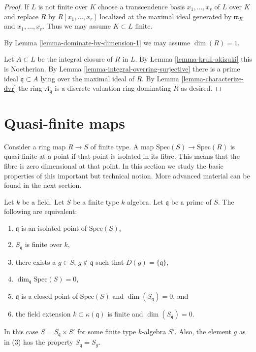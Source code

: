 \begin{proof}
If $L$ is not finite over $K$ choose a transcendence basis
$x_1, \ldots, x_r$ of $L$ over $K$ and replace $R$ by
$R[x_1, \ldots, x_r]$ localized at the maximal ideal
generated by $\mathfrak m_R$ and $x_1, \ldots, x_r$.
Thus we may assume $K \subset L$ finite.

\medskip\noindent
By Lemma \ref{lemma-dominate-by-dimension-1} we may assume $\dim(R) = 1$.

\medskip\noindent
Let $A \subset L$ be the integral closure of $R$ in $L$.
By Lemma \ref{lemma-krull-akizuki} this is Noetherian.
By Lemma \ref{lemma-integral-overring-surjective} there
is a prime ideal $\mathfrak q \subset A$ lying
over the maximal ideal of $R$.
By Lemma \ref{lemma-characterize-dvr} the ring $A_{\mathfrak q}$ is a discrete
valuation ring dominating $R$ as desired.
\end{proof}
















\section{Quasi-finite maps}
\label{section-quasi-finite}

\noindent
Consider a ring map $R \to S$ of finite type.
A map $\text{Spec}(S) \to \text{Spec}(R)$ is quasi-finite
at a point if that point is isolated in its fibre.
This means that the fibre is zero dimensional at that point.
In this section we study the basic properties of this
important but technical notion. More advanced material
can be found in the next section.

\begin{lemma}
\label{lemma-isolated-point}
Let $k$ be a field.
Let $S$ be a finite type $k$ algebra.
Let $\mathfrak q$ be a prime of $S$.
The following are equivalent:
\begin{enumerate}
\item $\mathfrak q$ is an isolated point of $\text{Spec}(S)$,
\item $S_{\mathfrak q}$ is finite over $k$,
\item there exists a $g \in S$, $g \not\in \mathfrak q$ such that
$D(g) = \{ \mathfrak q \}$,
\item $\dim_{\mathfrak q} \text{Spec}(S) = 0$,
\item $\mathfrak q$ is a closed point of $\text{Spec}(S)$ and
$\dim(S_{\mathfrak q}) = 0$, and
\item the field extension $k \subset \kappa(\mathfrak q)$ is finite
and $\dim(S_{\mathfrak q}) = 0$.
\end{enumerate}
In this case $S = S_{\mathfrak q} \times S'$ for some
finite type $k$-algebra $S'$. Also, the element $g$
as in (3) has the property $S_{\mathfrak q} = S_g$.
\end{lemma}

